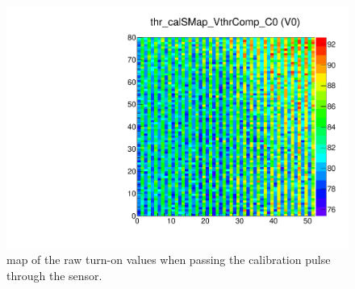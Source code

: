 \begin{figure}[!htp]
\centering
\begin{minipage}{0.45\textwidth}
  \includegraphics[width=1.0\textwidth]{figures/bb3_thr_calSMap_VthrComp.pdf}
  \caption{\roc map of the raw \vthrcomp turn-on values when passing the calibration pulse through the sensor.}
  \label{fig:bb3_thr_calSMap_VthrComp}
\end{minipage}
\end{figure}

